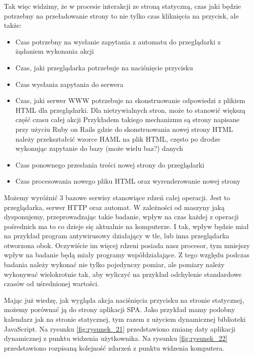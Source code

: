 Tak więc widzimy, że w procesie interakcji ze stroną statyczną, czas jaki będzie potrzebny na przeładowanie strony to nie tylko czas kliknięcia na przycisk, ale także:
\begin{itemize}
    \item Czas potrzebny na wysłanie zapytania z automatu do przeglądarki z żądaniem wykonania akcji
    \item Czas, jaki przeglądarka potrzebuje na naciśnięcie przycisku
    \item Czas wysłania zapytania do serwera
    \item Czas, jaki serwer WWW potrzebuje na skonstruowanie odpowiedzi z plikiem HTML dla przeglądarki. Dla nietrywialnych stron, może to stanowić większą część czasu całej akcji
    Przykładem takiego mechanizmu są strony napisane przy użyciu Ruby on Rails gdzie do skonstruowania nowej strony HTML
    należy przekształcić wzorce HAML \cite{ruby} na plik HTML, często po drodze wykonując zapytanie do bazy (może wielu baz?) danych
    \item Czas ponownego przesłania treści nowej strony do przeglądarki
    \item Czas procesowania nowego pliku HTML oraz wyrenderowanie nowej strony
\end{itemize}

Możemy wyróżnić 3 bazowe serwisy stanowiące rdzeń całej operacji.
Jest to przeglądarka, serwer HTTP oraz automat.
W zależności od maszyny jaką dysponujemy, przeprowadzając takie badanie, wpływ na czas każdej z operacji pośrednich ma to co dzieje się aktualnie na komputerze.
I tak, wpływ będzie miał na przykład program antywirusowy działający w tle, lub inna przeglądarka otworzona obok.
Oczywiście im więcej rdzeni \cite{threads} posiada nasz procesor, tym mniejszy wpływ na badanie będą miały programy współdziałające.
Z tego względu podczas badania należy wykonać nie tylko pojedynczy pomiar, ale pomiary należy wykonywać wielokrotnie tak, aby wyliczyć na przykład
odchylenie standardowe czasów od uśrednionej wartości.

Mając już wiedzę, jak wygląda akcja naciśnięcia przycisku na stronie statycznej, możemy porównać ją do strony aplikacji SPA.
Jako przykład mamy podobny kalendarz jak na stronie statycznej, tym razem z użyciem dynamicznej biblioteki JavaScript.
Na rysunku \ref{fig:rysunek_21} przedstawiono zmianę daty aplikacji dynamicznej z punktu widzenia użytkownika.
Na rysunku \ref{fig:rysunek_22} przedstawiono rozpisaną kolejność zdarzeń z punktu widzenia komputera.

